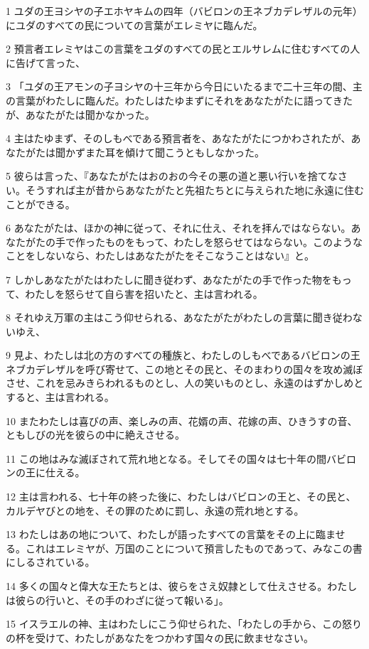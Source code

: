 \par 1 ユダの王ヨシヤの子エホヤキムの四年（バビロンの王ネブカデレザルの元年）にユダのすべての民についての言葉がエレミヤに臨んだ。
\par 2 預言者エレミヤはこの言葉をユダのすべての民とエルサレムに住むすべての人に告げて言った、
\par 3 「ユダの王アモンの子ヨシヤの十三年から今日にいたるまで二十三年の間、主の言葉がわたしに臨んだ。わたしはたゆまずにそれをあなたがたに語ってきたが、あなたがたは聞かなかった。
\par 4 主はたゆまず、そのしもべである預言者を、あなたがたにつかわされたが、あなたがたは聞かずまた耳を傾けて聞こうともしなかった。
\par 5 彼らは言った、『あなたがたはおのおの今その悪の道と悪い行いを捨てなさい。そうすれば主が昔からあなたがたと先祖たちとに与えられた地に永遠に住むことができる。
\par 6 あなたがたは、ほかの神に従って、それに仕え、それを拝んではならない。あなたがたの手で作ったものをもって、わたしを怒らせてはならない。このようなことをしないなら、わたしはあなたがたをそこなうことはない』と。
\par 7 しかしあなたがたはわたしに聞き従わず、あなたがたの手で作った物をもって、わたしを怒らせて自ら害を招いたと、主は言われる。
\par 8 それゆえ万軍の主はこう仰せられる、あなたがたがわたしの言葉に聞き従わないゆえ、
\par 9 見よ、わたしは北の方のすべての種族と、わたしのしもべであるバビロンの王ネブカデレザルを呼び寄せて、この地とその民と、そのまわりの国々を攻め滅ぼさせ、これを忌みきらわれるものとし、人の笑いものとし、永遠のはずかしめとすると、主は言われる。
\par 10 またわたしは喜びの声、楽しみの声、花婿の声、花嫁の声、ひきうすの音、ともしびの光を彼らの中に絶えさせる。
\par 11 この地はみな滅ぼされて荒れ地となる。そしてその国々は七十年の間バビロンの王に仕える。
\par 12 主は言われる、七十年の終った後に、わたしはバビロンの王と、その民と、カルデヤびとの地を、その罪のために罰し、永遠の荒れ地とする。
\par 13 わたしはあの地について、わたしが語ったすべての言葉をその上に臨ませる。これはエレミヤが、万国のことについて預言したものであって、みなこの書にしるされている。
\par 14 多くの国々と偉大な王たちとは、彼らをさえ奴隷として仕えさせる。わたしは彼らの行いと、その手のわざに従って報いる」。
\par 15 イスラエルの神、主はわたしにこう仰せられた、「わたしの手から、この怒りの杯を受けて、わたしがあなたをつかわす国々の民に飲ませなさい。
